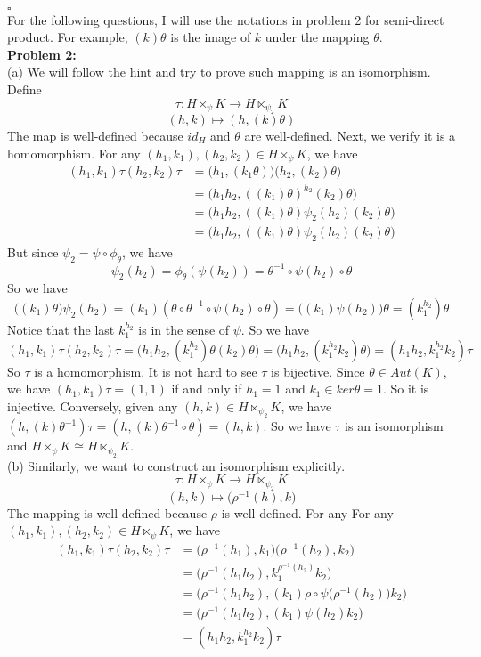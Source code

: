 \documentclass[12pt]{amsart}
\begin{document}
\\\phantom{qed}\hfill$\square$\\
For the following questions, I will use the notations in problem 2 for semi-direct product. For example, $(k)\theta$ is the image of $k$ under the mapping $\theta$.\\
\textbf{Problem 2:} \\
(a) We will follow the hint and try to prove such mapping is an isomorphism. Define
\[\tau: H\ltimes_\psi K\to H\ltimes_{\psi_2} K\]
\[(h,k)\mapsto (h,(k)\theta)\]
The map is well-defined because $id_H$ and $\theta$ are well-defined. Next, we verify it is a homomorphism. For any $(h_1,k_1),(h_2,k_2)\in H\ltimes_\psi K$, we have
\begin{align*}
    (h_1,k_1)\tau(h_2,k_2)\tau & =\big(h_1,(k_1\theta)\big)\big(h_2,(k_2)\theta\big)      \\
                               & = \big(h_1h_2,((k_1)\theta)^{h_2}(k_2)\theta\big)        \\
                               & = \big(h_1h_2,((k_1)\theta)\psi_2({h_2})(k_2)\theta\big) \\
                               & = \big(h_1h_2,((k_1)\theta)\psi_2({h_2})(k_2)\theta\big)
\end{align*}
But since $\psi_2=\psi\circ \phi_\theta$, we have
\[\psi_2(h_2)=\phi_\theta(\psi(h_2))=\theta^{-1}\circ \psi(h_2)\circ \theta\]
So we have
\[\big((k_1)\theta\big)\psi_2({h_2})=(k_1)(\theta\circ \theta^{-1}\circ \psi(h_2)\circ \theta)=\big((k_1)\psi(h_2)\big)\theta=(k_1^{h_2})\theta\]
Notice that the last $k_1^{h_2}$ is in the sense of $\psi$. So we have
\[(h_1,k_1)\tau(h_2,k_2)\tau=\big(h_1h_2,(k_1^{h_2})\theta(k_2)\theta\big)=\big(h_1h_2,(k_1^{h_2}k_2)\theta\big)=(h_1h_2,k_1^{h_2}k_2)\tau\]
So $\tau$ is a homomorphism. It is not hard to see $\tau$ is bijective. Since $\theta \in Aut(K)$, we have $(h_1,k_1)\tau=(1,1)$ if and only if $h_1=1$ and $k_1\in ker \theta =1$. So it is injective. Conversely, given any $(h,k)\in H\ltimes_{\psi_2}K$, we have $(h,(k)\theta^{-1})\tau=(h,(k)\theta^{-1}\circ \theta)=(h,k)$. So we have $\tau$ is an isomorphism and $H\ltimes_\psi K\cong H\ltimes_{\psi_2} K$.\\
(b) Similarly, we want to construct an isomorphism explicitly.
\[\tau: H\ltimes_\psi K\to H\ltimes_{\psi_2} K\]
\[(h,k)\mapsto \big(\rho^{-1}(h),k\big)\]
The mapping is well-defined because $\rho$ is well-defined. For any For any $(h_1,k_1),(h_2,k_2)\in H\ltimes_\psi K$, we have
\begin{align*}
    (h_1,k_1)\tau(h_2,k_2)\tau & =\big(\rho^{-1}(h_1),k_1)\big(\rho^{-1}(h_2),k_2\big)                       \\
                               & =\big(\rho^{-1}(h_1h_2),k_1^{\rho^{-1}(h_2)}k_2\big)                        \\
                               & =\big(\rho^{-1}(h_1h_2),(k_1)\rho\circ \psi\big(\rho^{-1}(h_2)\big)k_2\big) \\
                               & =\big(\rho^{-1}(h_1h_2),(k_1)\psi(h_2)k_2\big)                              \\
                               & =(h_1h_2,k_1^{h_2}k_2)\tau
\end{align*}
\end{document}
